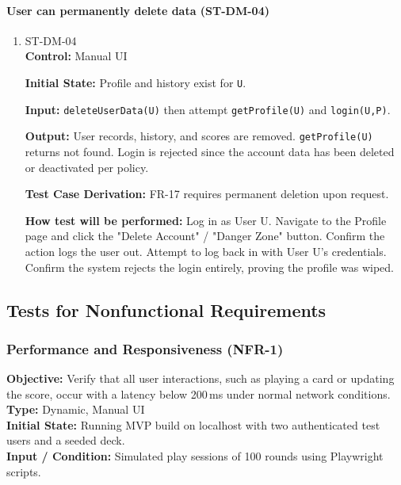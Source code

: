 \documentclass[12pt, titlepage]{article}
\begin{document}
\paragraph{User can permanently delete data (ST-DM-04)}
\begin{enumerate}
\item{ST-DM-04\\}
\textbf{Control:} Manual UI

\textbf{Initial State:} Profile and history exist for \texttt{U}.

\textbf{Input:} \texttt{deleteUserData(U)} then attempt \texttt{getProfile(U)} and \texttt{login(U,P)}.

\textbf{Output:} User records, history, and scores are removed. \texttt{getProfile(U)} returns not found. Login is rejected since the account data has been deleted or deactivated per policy.

\textbf{Test Case Derivation:} FR-17 requires permanent deletion upon request.

\textbf{How test will be performed:} Log in as User U. Navigate to the Profile page and click the "Delete Account" / "Danger Zone" button. Confirm the action logs the user out. Attempt to log back in with User U's credentials. Confirm the system rejects the login entirely, proving the profile was wiped.
\end{enumerate}


\subsection{Tests for Nonfunctional Requirements}

    \subsubsection{Performance and Responsiveness (NFR-1)}
    \textbf{Objective:} Verify that all user interactions, such as playing a card or updating the score, occur with a latency below 200\,ms under normal network conditions. \\

    \textbf{Type:} Dynamic, Manual UI \\

    \textbf{Initial State:} Running MVP build on localhost with two authenticated test users and a seeded deck. \\

    \textbf{Input / Condition:} Simulated play sessions of 100 rounds using Playwright scripts. \\
\end{document}
